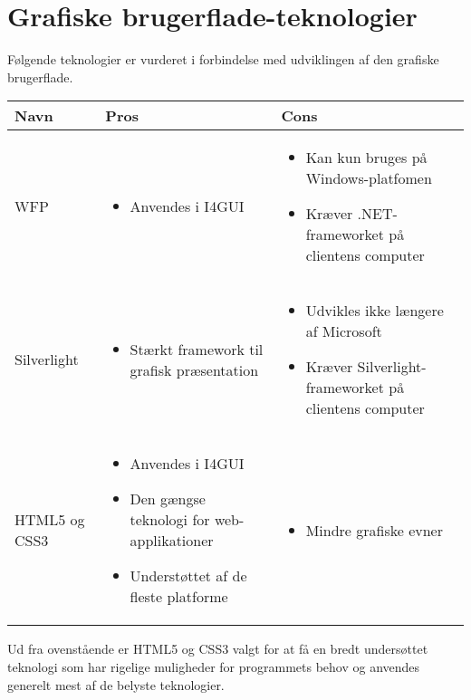 \section{Grafiske brugerflade-teknologier}

Følgende teknologier er vurderet i forbindelse med udviklingen af den grafiske brugerflade.

\begin{tabular}{|p{3cm}|p{5.5cm}|p{5.5cm}|}
\hline 
\textbf{Navn} & \textbf{Pros} & \textbf{Cons} \\ 
\hline

WFP
	&
	\begin{itemize}
		\item Anvendes i I4GUI
	\end{itemize}
	&
	\begin{itemize}
		\item Kan kun bruges på Windows-platfomen
		\item Kræver .NET-frameworket på clientens computer
	\end{itemize}
	\\
	\hline

Silverlight
	&
	\begin{itemize}
		\item Stærkt framework til grafisk præsentation
	\end{itemize}
	&
	\begin{itemize}
		\item Udvikles ikke længere af Microsoft
		\item Kræver Silverlight-\newline frameworket på clientens computer
	\end{itemize}
	\\
	\hline

HTML5 og CSS3
	&
	\begin{itemize}
		\item Anvendes i I4GUI
		\item Den gængse teknologi for web-applikationer
		\item Understøttet af de fleste platforme
	\end{itemize}
	&
	\begin{itemize}
	\item Mindre grafiske evner
	\end{itemize}
	\\
	\hline
\end{tabular} 

Ud fra ovenstående er HTML5 og CSS3 valgt for at få en bredt undersøttet teknologi som har rigelige muligheder for programmets behov og anvendes generelt mest af de belyste teknologier.